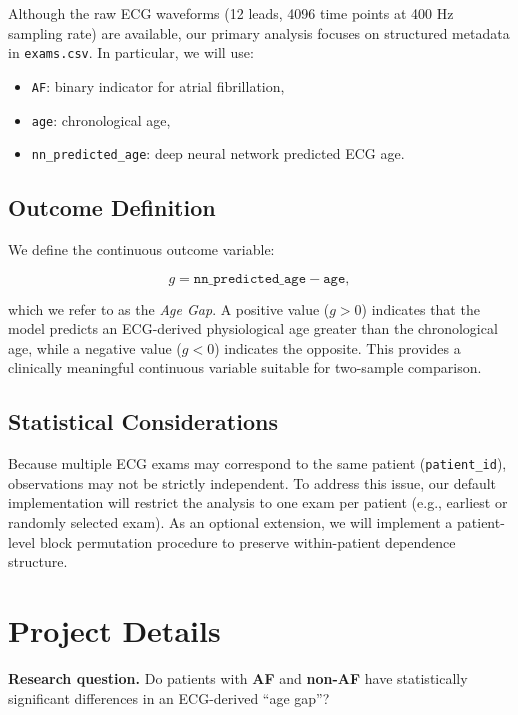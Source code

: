 \documentclass{article}
\begin{document}
\begin{normalsize}
    Although the raw ECG waveforms (12 leads, 4096 time points at 400 Hz sampling rate)
    are available, our primary analysis focuses on structured metadata in
    \texttt{exams.csv}. In particular, we will use:

    \begin{itemize}
        \item \texttt{AF}: binary indicator for atrial fibrillation,
        \item \texttt{age}: chronological age,
        \item \texttt{nn\_predicted\_age}: deep neural network predicted ECG age.
    \end{itemize}

    \subsection*{Outcome Definition}

    We define the continuous outcome variable:

    \[
    g = \texttt{nn\_predicted\_age} - \texttt{age},
    \]

    which we refer to as the \textit{Age Gap}. A positive value ($g>0$) indicates
    that the model predicts an ECG-derived physiological age greater than the
    chronological age, while a negative value ($g<0$) indicates the opposite.
    This provides a clinically meaningful continuous variable suitable for
    two-sample comparison.

    \subsection*{Statistical Considerations}

    Because multiple ECG exams may correspond to the same patient
    (\texttt{patient\_id}), observations may not be strictly independent.
    To address this issue, our default implementation will restrict the analysis
    to one exam per patient (e.g., earliest or randomly selected exam).
    As an optional extension, we will implement a patient-level block permutation
    procedure to preserve within-patient dependence structure.

	\section{Project Details}
    \textbf{Research question.} Do patients with \textbf{AF} and \textbf{non-AF} have statistically significant differences in an ECG-derived ``age gap''?


\end{normalsize}
\end{document}
